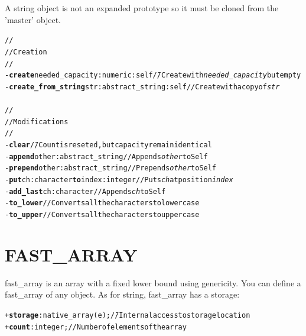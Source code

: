 \documentclass[11pt]{mybook}
\begin{document}
A {\sc{}string} object is not an expanded prototype so it must be cloned from the 'master' object.
\begin{alltt}
\begin{tabbing}
  //\\
  // Creation \\
  //\\
  - {\bf{}create} needed\_capacity:{\sc{}numeric} :{\sc{}self}  \= // Create with {\it{}needed\_capacity} but empty \\
  - {\bf{}create\_from\_string} str:{\sc{}abstract\_string} :{\sc{}self} \>       // Create with a copy of {\it{}str}\\
\\
  //\\
  // Modifications\\
  // \\
  - {\bf{}clear}                       \= // Count is reseted, but capacity remain identical \\
  - {\bf{}append} other:{\sc{}abstract\_string}                 \>    // Appends {\it{}other} to Self \\
  - {\bf{}prepend} other:{\sc{}abstract\_string}                \>    // Prepends {\it{}other} to Self \\
  - {\bf{}put} ch:{\sc{}character} {\bf{}to} index:{\sc{}integer} \>         // Puts {\it{}ch} at position {\it{}index} \\
  - {\bf{}add\_last} ch:{\sc{}character}                        \>    // Appends {\it{}ch} to Self \\
  - {\bf{}to\_lower}                                            \>    // Converts all the characters to lower case \\
  - {\bf{}to\_upper}                                            \>    // Converts all the characters to upper case
\end{tabbing}
\end{alltt}


\section{FAST\_ARRAY}
\label{library:fast_array}
%
{\sc{}fast\_array} is an array with a fixed lower bound using genericity.
You can define a {\sc{}fast\_array} of any object.
As for {\sc{}string}, {\sc{}fast\_array} has a storage:
\begin{alltt}
\begin{tabbing}
  + {\bf{}storage}:{\sc{}native\_array(e)};  \= // Internal access to storage location \\
  + {\bf{}count}:{\sc{}integer};             \> // Number of elements of the array \\
\end{tabbing}
\end{alltt}
\end{document}
